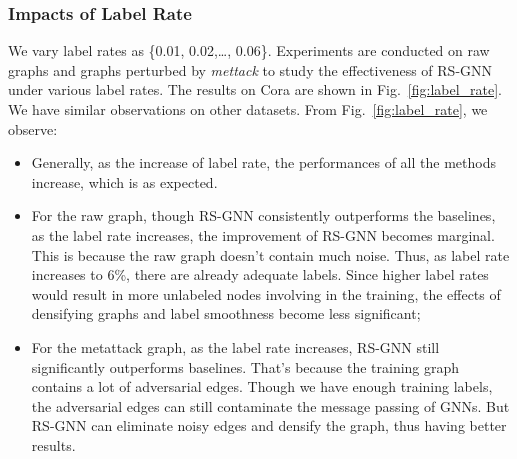 \subsubsection{Impacts of Label Rate} We vary label rates as \{0.01, 0.02,\dots, 0.06\}. Experiments are conducted on raw graphs and graphs perturbed by \textit{mettack} to study the effectiveness of RS-GNN under various label rates. The results on Cora are shown in Fig.~\ref{fig:label_rate}. We have similar observations on other datasets. From Fig.~\ref{fig:label_rate}, we observe:
\begin{itemize}[leftmargin=*]
    \item Generally, as the increase of label rate, the performances of all the methods increase, which is as expected.
    \item For the raw graph, though RS-GNN consistently outperforms the baselines, as the label rate increases, the improvement of RS-GNN becomes marginal. This is because the raw graph doesn't contain much noise. Thus, as label rate increases to 6\%, there are already adequate labels. Since higher label rates would result in more unlabeled nodes involving in the training, the effects of densifying graphs and label smoothness become less significant; %
    \item For the metattack graph, as the label rate increases, RS-GNN still significantly outperforms baselines. That's because the training graph contains a lot of adversarial edges. Though we have enough training labels, the adversarial edges can still contaminate the message passing of GNNs. But RS-GNN can eliminate noisy edges and densify the graph, thus having better results.
\end{itemize}



